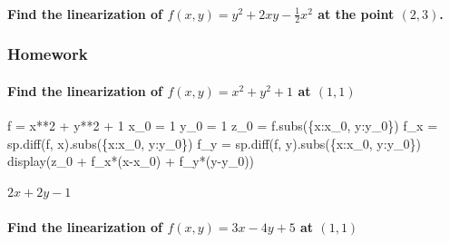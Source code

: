 \documentclass[
  letterpaper,
  DIV=11,
  numbers=noendperiod]{scrartcl}
\let\oldparagraph\paragraph
\renewcommand{\paragraph}[1]{\oldparagraph{#1}\mbox{}}
\newenvironment{Shaded}{\begin{snugshade}}{\end{snugshade}}
\newcommand{\DecValTok}[1]{\textcolor[rgb]{0.68,0.00,0.00}{#1}}
\newcommand{\NormalTok}[1]{\textcolor[rgb]{0.00,0.23,0.31}{#1}}
\newcommand{\OperatorTok}[1]{\textcolor[rgb]{0.37,0.37,0.37}{#1}}
\begin{document}
\hypertarget{find-the-linearization-of-fx-y-y2-2xy---frac12x2-at-the-point-2-3.}{%
\paragraph{\texorpdfstring{Find the linearization of
\(f(x, y) = y^2 + 2xy - \frac{1}{2}x^2\) at the point
\((2, 3)\).}{Find the linearization of f(x, y) = y\^{}2 + 2xy - \textbackslash frac\{1\}\{2\}x\^{}2 at the point (2, 3).}}\label{find-the-linearization-of-fx-y-y2-2xy---frac12x2-at-the-point-2-3.}}

\hypertarget{homework-1}{%
\subsubsection{Homework}\label{homework-1}}

\hypertarget{find-the-linearization-of-fx-y-x2-y2-1-at-1-1}{%
\paragraph{\texorpdfstring{Find the linearization of
\(f(x, y) = x^2 + y^2 + 1\) at
\((1, 1)\)}{Find the linearization of f(x, y) = x\^{}2 + y\^{}2 + 1 at (1, 1)}}\label{find-the-linearization-of-fx-y-x2-y2-1-at-1-1}}

\begin{Shaded}
\begin{Highlighting}[numbers=left,,]
\NormalTok{f }\OperatorTok{=}\NormalTok{ x}\OperatorTok{**}\DecValTok{2} \OperatorTok{+}\NormalTok{ y}\OperatorTok{**}\DecValTok{2} \OperatorTok{+} \DecValTok{1}
\NormalTok{x\_0 }\OperatorTok{=} \DecValTok{1}
\NormalTok{y\_0 }\OperatorTok{=} \DecValTok{1}
\NormalTok{z\_0 }\OperatorTok{=}\NormalTok{ f.subs(\{x:x\_0, y:y\_0\})}
\NormalTok{f\_x }\OperatorTok{=}\NormalTok{ sp.diff(f, x).subs(\{x:x\_0, y:y\_0\})}
\NormalTok{f\_y }\OperatorTok{=}\NormalTok{ sp.diff(f, y).subs(\{x:x\_0, y:y\_0\})}
\NormalTok{display(z\_0 }\OperatorTok{+}\NormalTok{ f\_x}\OperatorTok{*}\NormalTok{(x}\OperatorTok{{-}}\NormalTok{x\_0) }\OperatorTok{+}\NormalTok{ f\_y}\OperatorTok{*}\NormalTok{(y}\OperatorTok{{-}}\NormalTok{y\_0))}
\end{Highlighting}
\end{Shaded}

$\displaystyle 2 x + 2 y - 1$

\hypertarget{find-the-linearization-of-fx-y-3x-4y5-at-1-1}{%
\paragraph{\texorpdfstring{Find the linearization of
\(f(x, y) = 3x-4y+5\) at
\((1, 1)\)}{Find the linearization of f(x, y) = 3x-4y+5 at (1, 1)}}\label{find-the-linearization-of-fx-y-3x-4y5-at-1-1}}
\end{document}
